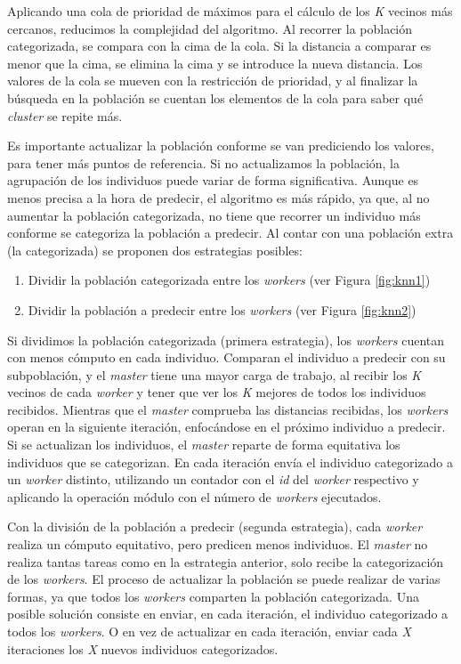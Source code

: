 		Aplicando una cola de prioridad de máximos para el cálculo de los \textit{K} vecinos más cercanos, reducimos la complejidad del algoritmo. Al recorrer la población categorizada, se compara con la cima de la cola. Si la distancia a comparar es menor que la cima, se elimina la cima y se introduce la nueva distancia. Los valores de la cola se mueven con la restricción de prioridad, y al finalizar la búsqueda en la población se cuentan los elementos de la cola para saber qué \textit{cluster} se repite más.
		
		Es importante actualizar la población conforme se van prediciendo los valores, para tener más puntos de referencia. Si no actualizamos la población, la agrupación de los individuos puede variar de forma significativa. Aunque es menos precisa a la hora de predecir, el algoritmo es más rápido, ya que, al no aumentar la población categorizada, no tiene que recorrer un individuo más conforme se categoriza la población a predecir. Al contar con una población extra (la categorizada) se proponen dos estrategias posibles:
		
		
		\begin{enumerate}
			\item Dividir la población categorizada entre los \textit{workers} (ver Figura \ref{fig:knn1})
			\item Dividir la población a predecir entre los \textit{workers} (ver Figura \ref{fig:knn2})
		\end{enumerate}
		
		Si dividimos la población categorizada (primera estrategia), los \textit{workers} cuentan con menos cómputo en cada individuo. Comparan el individuo a predecir con su subpoblación, y el \textit{master} tiene una mayor carga de trabajo, al recibir los \textit{K} vecinos de cada \textit{worker} y tener que ver los \textit{K} mejores de todos los individuos recibidos.  Mientras que el \textit{master} comprueba las distancias recibidas, los \textit{workers} operan en la siguiente iteración, enfocándose en el próximo individuo a predecir. Si se actualizan los individuos, el \textit{master} reparte de forma equitativa los individuos que se categorizan. En cada iteración envía el individuo categorizado a un \textit{worker} distinto, utilizando un contador con el \textit{id} del \textit{worker} respectivo y aplicando la operación módulo con el número de \textit{workers} ejecutados.
		
		Con la división de la población a predecir (segunda estrategia), cada \textit{worker} realiza un cómputo equitativo, pero predicen menos individuos. El \textit{master} no realiza tantas tareas como en la estrategia anterior, solo recibe la categorización de los \textit{workers}. El proceso de actualizar la población se puede realizar de varias formas, ya que todos los \textit{workers} comparten la población categorizada. Una posible solución consiste en enviar, en cada iteración, el individuo categorizado a todos los \textit{workers}. O en vez de actualizar en cada iteración, enviar cada \textit{X} iteraciones los \textit{X} nuevos individuos categorizados.
		
